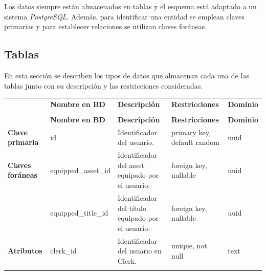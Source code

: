 Los datos siempre están almacenados en tablas y el esquema está adaptado a un sistema \textit{PostgreSQL}. Además, para identificar una entidad se emplean claves primarias y para establecer relaciones se utilizan claves foráneas.



\subsection{Tablas}

En esta sección se describen los tipos de datos que almacenan cada una de las tablas junto con su descripción y las restricciones consideradas.


\renewcommand{\arraystretch}{1.35}
\setlength{\tabcolsep}{3pt}
\small

\begin{longtable}{|
>{\raggedright\arraybackslash}p{1.9cm}|
>{\raggedright\arraybackslash}p{2.7cm}|
>{\raggedright\arraybackslash}p{4.9cm}|
>{\raggedright\arraybackslash}p{2.7cm}|
>{\raggedright\arraybackslash}p{2.1cm}|
}
\hline

\rowcolor[gray]{0.75}
\multicolumn{5}{|c|}{\textbf{Usuarios}} \\
\hline

 & \textbf{Nombre en BD} & \textbf{Descripción} & \textbf{Restricciones} & \textbf{Dominio} \\
\hline
\endfirsthead

\hline
\rowcolor[gray]{0.75}
\multicolumn{5}{|c|}{\textbf{Usuarios}} \\
\hline

 & \textbf{Nombre en BD} & \textbf{Descripción} & \textbf{Restricciones} & \textbf{Dominio} \\
\hline
\endhead

\textbf{Clave primaria} 
& id 
& Identificador del usuario.
& primary key, default random 
& uuid \\
\hline

\textbf{Claves foráneas}
& equipped\_\allowbreak asset\_\allowbreak id 
& Identificador del asset equipado por el usuario. 
& foreign key, nullable 
& uuid \\
\cline{2-5}

& equipped\_\allowbreak title\_\allowbreak id 
& Identificador del título equipado por el usuario. 
& foreign key, nullable 
& uuid \\
\hline

\textbf{Atributos}
& clerk\_\allowbreak id 
& Identificador del usuario en Clerk. 
& unique, not null 
& text \\
\cline{2-5}


\end{longtable}
